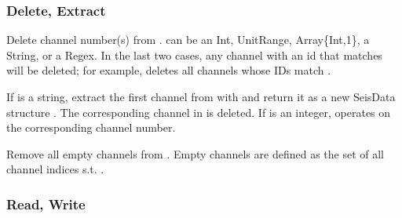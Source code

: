 \documentclass[letterpaper,11pt,english]{sphinxmanual}
\begin{document}
\subsubsection{Delete, Extract}
\label{\detokenize{src/seisdata:delete-extract}}

\begin{fulllineitems}
\end{fulllineitems}



\begin{fulllineitems}
\end{fulllineitems}



\begin{fulllineitems}
\end{fulllineitems}


Delete channel number(s)  from .  can be an Int, UnitRange, Array\{Int,1\}, a String, or a Regex. In the last two cases, any channel with an id that matches  will be deleted; for example,  deletes all channels whose IDs match .


\begin{fulllineitems}
\end{fulllineitems}


If  is a string, extract the first channel from  with  and return it as a new SeisData structure . The corresponding channel in  is deleted. If  is an integer,  operates on the corresponding channel number.


\begin{fulllineitems}
\end{fulllineitems}


Remove all empty channels from . Empty channels are defined as the set of all channel indices  s.t. .


\subsubsection{Read, Write}
\label{\detokenize{src/seisdata:read-write}}
\end{document}
